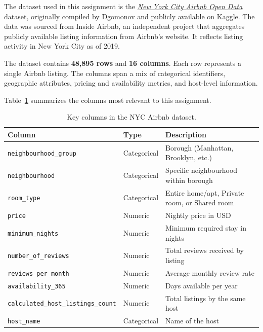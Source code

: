 
The dataset used in this assignment is the \hyperlink{https://www.kaggle.com/datasets/dgomonov/new-york-city-airbnb-open-data}{\textit{New York City Airbnb Open Data}} dataset, originally compiled by Dgomonov and publicly available on Kaggle.
The data was sourced from Inside Airbnb, an independent project that aggregates publicly available listing information from Airbnb's website. It reflects listing activity in New York City as of 2019.


The dataset contains \textbf{48,895 rows} and \textbf{16 columns}. Each row represents a single Airbnb listing. The columns span a mix of categorical identifiers, geographic attributes, pricing and availability metrics, and host-level information.


Table~\ref{tab:columns} summarizes the columns most relevant to this assignment.

\begin{table}[h]
  \centering
  \begin{tabular}{lll}
    \hline
    \textbf{Column} & \textbf{Type} & \textbf{Description} \\
    \hline
    \texttt{neighbourhood\_group} & Categorical & Borough (Manhattan, Brooklyn, etc.) \\
    \texttt{neighbourhood}        & Categorical & Specific neighbourhood within borough \\
    \texttt{room\_type}           & Categorical & Entire home/apt, Private room, or Shared room \\
    \texttt{price}                & Numeric     & Nightly price in USD \\
    \texttt{minimum\_nights}      & Numeric     & Minimum required stay in nights \\
    \texttt{number\_of\_reviews}  & Numeric     & Total reviews received by listing \\
    \texttt{reviews\_per\_month}  & Numeric     & Average monthly review rate \\
    \texttt{availability\_365}    & Numeric     & Days available per year \\
    \texttt{calculated\_host\_listings\_count} & Numeric & Total listings by the same host \\
    \texttt{host\_name}           & Categorical & Name of the host \\
    \hline
  \end{tabular}
  \caption{Key columns in the NYC Airbnb dataset.}
  \label{tab:columns}
\end{table}

